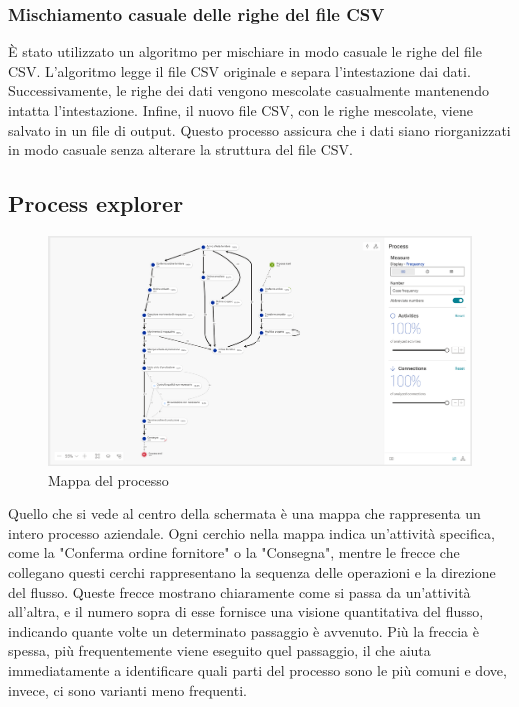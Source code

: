 \documentclass{article}
\begin{document}
\subsubsection{Mischiamento casuale delle righe del file CSV}
È stato utilizzato un algoritmo per mischiare in modo casuale le righe del file CSV. L'algoritmo legge il file CSV originale e separa l'intestazione dai dati. Successivamente, le righe dei dati vengono mescolate casualmente mantenendo intatta l'intestazione. Infine, il nuovo file CSV, con le righe mescolate, viene salvato in un file di output. Questo processo assicura che i dati siano riorganizzati in modo casuale senza alterare la struttura del file CSV.

\subsection{Process explorer}
\begin{figure}[H]
    \centering
    \includegraphics[width=\textwidth]{imgARIS/Simulazione/ProcessExplorerSimulazione.png}
    \caption{Mappa del processo}
    \label{fig:process-map}
\end{figure}
Quello che si vede al centro della schermata è una mappa che rappresenta un intero processo aziendale. Ogni cerchio nella mappa indica un'attività specifica, come la "Conferma ordine fornitore" o la "Consegna", mentre le frecce che collegano questi cerchi rappresentano la sequenza delle operazioni e la direzione del flusso. Queste frecce mostrano chiaramente come si passa da un'attività all'altra, e il numero sopra di esse fornisce una visione quantitativa del flusso, indicando quante volte un determinato passaggio è avvenuto. Più la freccia è spessa, più frequentemente viene eseguito quel passaggio, il che aiuta immediatamente a identificare quali parti del processo sono le più comuni e dove, invece, ci sono varianti meno frequenti.\\
\end{document}
